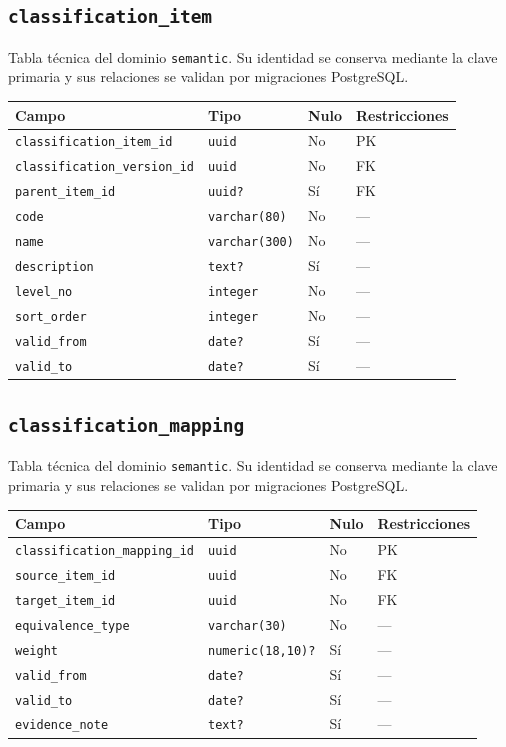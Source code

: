 \documentclass[11pt]{article}
\begin{document}
\subsection{\texttt{classification\_item}}
Tabla técnica del dominio \texttt{semantic}. Su identidad se conserva mediante la clave primaria y sus relaciones se validan por migraciones PostgreSQL.
\begin{longtable}{>{\raggedright\arraybackslash}p{} p{} p{} p{}}
\toprule Campo & Tipo & Nulo & Restricciones \\ \midrule\endhead
\texttt{classification\_item\_id} & \texttt{uuid} & No & PK \\
\texttt{classification\_version\_id} & \texttt{uuid} & No & FK \\
\texttt{parent\_item\_id} & \texttt{uuid?} & Sí & FK \\
\texttt{code} & \texttt{varchar(80)} & No & --- \\
\texttt{name} & \texttt{varchar(300)} & No & --- \\
\texttt{description} & \texttt{text?} & Sí & --- \\
\texttt{level\_no} & \texttt{integer} & No & --- \\
\texttt{sort\_order} & \texttt{integer} & No & --- \\
\texttt{valid\_from} & \texttt{date?} & Sí & --- \\
\texttt{valid\_to} & \texttt{date?} & Sí & --- \\
\bottomrule\end{longtable}
\subsection{\texttt{classification\_mapping}}
Tabla técnica del dominio \texttt{semantic}. Su identidad se conserva mediante la clave primaria y sus relaciones se validan por migraciones PostgreSQL.
\begin{longtable}{>{\raggedright\arraybackslash}p{} p{} p{} p{}}
\toprule Campo & Tipo & Nulo & Restricciones \\ \midrule\endhead
\texttt{classification\_mapping\_id} & \texttt{uuid} & No & PK \\
\texttt{source\_item\_id} & \texttt{uuid} & No & FK \\
\texttt{target\_item\_id} & \texttt{uuid} & No & FK \\
\texttt{equivalence\_type} & \texttt{varchar(30)} & No & --- \\
\texttt{weight} & \texttt{numeric(18,10)?} & Sí & --- \\
\texttt{valid\_from} & \texttt{date?} & Sí & --- \\
\texttt{valid\_to} & \texttt{date?} & Sí & --- \\
\texttt{evidence\_note} & \texttt{text?} & Sí & --- \\
\bottomrule\end{longtable}
\end{document}
